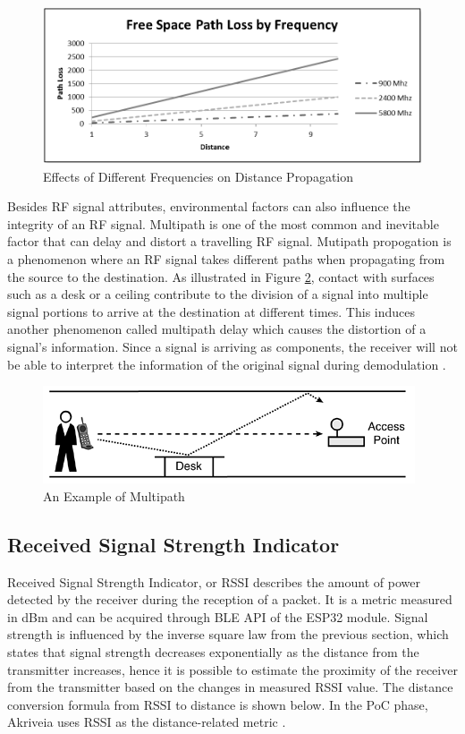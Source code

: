 \medskip
\begin{figure}[H]
\centering
    \includegraphics[width=\linewidth]{./images/FSP.png}
    \caption{Effects of Different Frequencies on Distance Propagation}
    \label{fsp}
\end{figure}

\medskip
Besides RF signal attributes, environmental factors can also influence the integrity of an RF signal. Multipath is one of the most common and inevitable factor that can delay and distort a travelling RF signal. Mutipath propogation is a phenomenon where an RF signal takes different paths when propagating from the source to the destination. As illustrated in Figure \ref{multipath}, contact with surfaces such as a desk or a ceiling contribute to the division of a signal into multiple signal portions to arrive at the destination at different times. This induces another phenomenon called multipath delay which causes the distortion of a signal's information. Since a signal is arriving as components, the receiver will not be able to interpret the information of the original signal during demodulation \cite{R2-4-1}.

\medskip
\begin{figure}[H]
\centering
    \includegraphics[scale=1.2]{./images/multipath.png}
    \caption{An Example of Multipath}
    \label{multipath}
\end{figure}

\pagebreak
\subsection{Received Signal Strength Indicator}
\medskip
Received Signal Strength Indicator, or RSSI describes the amount of power detected by the receiver during the reception of a packet. It is a metric measured in dBm and can be acquired through BLE API of the ESP32 module. Signal strength is influenced by the inverse square law from the previous section, which states that signal strength decreases exponentially as the distance from the transmitter increases, hence it is possible to estimate the proximity of the receiver from the transmitter based on the changes in measured RSSI value. The distance conversion formula from RSSI to distance is shown below. In the PoC phase, Akriveia uses RSSI as the distance-related metric \cite{R2-5-1}.

